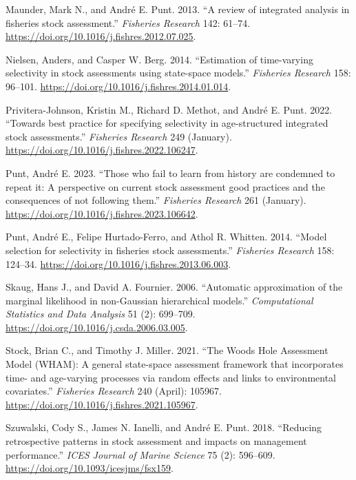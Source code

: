 \documentclass[
]{article}
\newlength{\cslhangindent}
\newlength{\cslentryspacingunit} %
\newenvironment{CSLReferences}[2] %
 {%
  \setlength{\parindent}{0pt}
  \ifodd #1
  \let\oldpar\par
  \def\par{\hangindent=\cslhangindent\oldpar}
  \fi
  \setlength{\parskip}{#2\cslentryspacingunit}
 }%
 {}
\begin{document}
{{{\begin{CSLReferences}{1}{0}
\leavevmode{}%
Maunder, Mark N., and André E. Punt. 2013. {``{A review of integrated
analysis in fisheries stock assessment}.''} \emph{Fisheries Research}
142: 61--74. \url{https://doi.org/10.1016/j.fishres.2012.07.025}.

\leavevmode{}%
Nielsen, Anders, and Casper W. Berg. 2014. {``{Estimation of
time-varying selectivity in stock assessments using state-space
models}.''} \emph{Fisheries Research} 158: 96--101.
\url{https://doi.org/10.1016/j.fishres.2014.01.014}.

\leavevmode{}%
Privitera-Johnson, Kristin M., Richard D. Methot, and André E. Punt.
2022. {``{Towards best practice for specifying selectivity in
age-structured integrated stock assessments}.''} \emph{Fisheries
Research} 249 (January).
\url{https://doi.org/10.1016/j.fishres.2022.106247}.

\leavevmode{}%
Punt, André E. 2023. {``{Those who fail to learn from history are
condemned to repeat it: A perspective on current stock assessment good
practices and the consequences of not following them}.''}
\emph{Fisheries Research} 261 (January).
\url{https://doi.org/10.1016/j.fishres.2023.106642}.

\leavevmode{}%
Punt, André E., Felipe Hurtado-Ferro, and Athol R. Whitten. 2014.
{``{Model selection for selectivity in fisheries stock assessments}.''}
\emph{Fisheries Research} 158: 124--34.
\url{https://doi.org/10.1016/j.fishres.2013.06.003}.

\leavevmode{}%
Skaug, Hans J., and David A. Fournier. 2006. {``{Automatic approximation
of the marginal likelihood in non-Gaussian hierarchical models}.''}
\emph{Computational Statistics and Data Analysis} 51 (2): 699--709.
\url{https://doi.org/10.1016/j.csda.2006.03.005}.

\leavevmode{}%
Stock, Brian C., and Timothy J. Miller. 2021. {``{The Woods Hole
Assessment Model (WHAM): A general state-space assessment framework that
incorporates time- and age-varying processes via random effects and
links to environmental covariates}.''} \emph{Fisheries Research} 240
(April): 105967. \url{https://doi.org/10.1016/j.fishres.2021.105967}.

\leavevmode{}%
Szuwalski, Cody S., James N. Ianelli, and André E. Punt. 2018.
{``{Reducing retrospective patterns in stock assessment and impacts on
management performance}.''} \emph{ICES Journal of Marine Science} 75
(2): 596--609. \url{https://doi.org/10.1093/icesjms/fsx159}.


\end{CSLReferences}}}}
\end{document}
